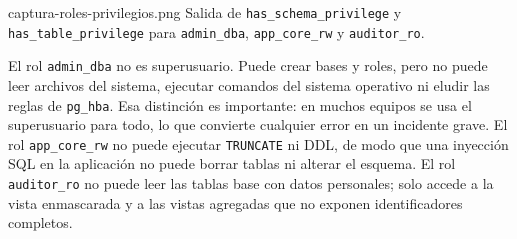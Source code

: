 %
  {captura-roles-privilegios.png}%
  {Salida de \texttt{has\_schema\_privilege} y \texttt{has\_table\_privilege} para \texttt{admin\_dba}, \texttt{app\_core\_rw} y \texttt{auditor\_ro}.}

El rol \texttt{admin\_dba} no es superusuario. Puede crear bases y roles,
pero no puede leer archivos del sistema, ejecutar comandos del sistema
operativo ni eludir las reglas de \texttt{pg\_hba}. Esa distinción es
importante: en muchos equipos se usa el superusuario para todo, lo que
convierte cualquier error en un incidente grave. El rol
\texttt{app\_core\_rw} no puede ejecutar \texttt{TRUNCATE} ni DDL, de modo
que una inyección SQL en la aplicación no puede borrar tablas ni alterar el
esquema. El rol \texttt{auditor\_ro} no puede leer las tablas base con datos
personales; solo accede a la vista enmascarada y a las vistas agregadas que no
exponen identificadores completos.

